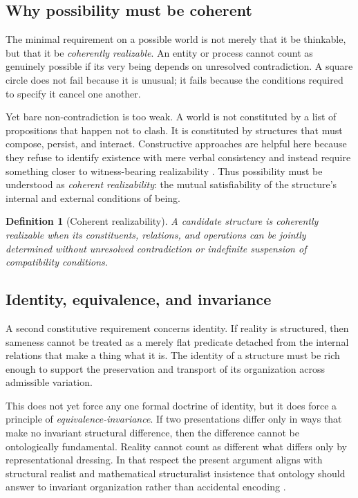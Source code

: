 \documentclass[11pt]{article}
\theoremstyle{foundation}
\newtheorem{definition}{Definition}
\begin{document}
\subsection{Why possibility must be coherent}

The minimal requirement on a possible world is not merely that it be thinkable, but that it be \emph{coherently realizable}. An entity or process cannot count as genuinely possible if its very being depends on unresolved contradiction. A square circle does not fail because it is unusual; it fails because the conditions required to specify it cancel one another.

Yet bare non-contradiction is too weak. A world is not constituted by a list of propositions that happen not to clash. It is constituted by structures that must compose, persist, and interact. Constructive approaches are helpful here because they refuse to identify existence with mere verbal consistency and instead require something closer to witness-bearing realizability \citep{MartinLof1984,UF2013}. Thus possibility must be understood as \emph{coherent realizability}: the mutual satisfiability of the structure's internal and external conditions of being.

\begin{definition}[Coherent realizability]
A candidate structure is coherently realizable when its constituents, relations, and operations can be jointly determined without unresolved contradiction or indefinite suspension of compatibility conditions.
\end{definition}

\subsection{Identity, equivalence, and invariance}

A second constitutive requirement concerns identity. If reality is structured, then sameness cannot be treated as a merely flat predicate detached from the internal relations that make a thing what it is. The identity of a structure must be rich enough to support the preservation and transport of its organization across admissible variation.

This does not yet force any one formal doctrine of identity, but it does force a principle of \emph{equivalence-invariance}. If two presentations differ only in ways that make no invariant structural difference, then the difference cannot be ontologically fundamental. Reality cannot count as different what differs only by representational dressing. In that respect the present argument aligns with structural realist and mathematical structuralist insistence that ontology should answer to invariant organization rather than accidental encoding \citep{Worrall1989,Ladyman1998,French2014,Shapiro1997}.
\end{document}
